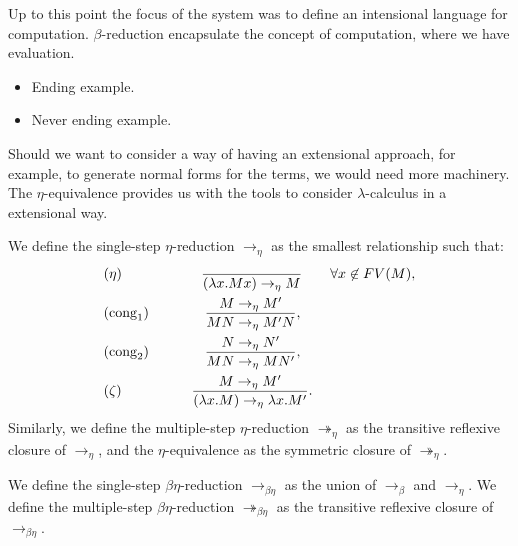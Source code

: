 Up to this point the focus of the system was to define an intensional language for computation. $\beta$-reduction encapsulate the concept of computation, where we have evaluation.

\begin{example}
  \begin{itemize}
  \item Ending example.
  \item Never ending example.
  \end{itemize}
\end{example}


Should we want to consider a way of having an extensional approach, for example, to generate normal forms for the terms, we would need more machinery. The $\eta$-equivalence provides us with the tools to consider $\lambda$-calculus in a extensional way. \\

\begin{definition}
  We define the single-step $\eta$-reduction $\to_\eta$ as the smallest relationship such that: 
  \begin{align*}
    &(\eta) \qquad\qquad \ \ \ \  \ {\ \over(\lambda x.Mx) \to_\eta M} \qquad \forall x \not  \in FV(M),\\
    &(\operatorname{cong}_1)\qquad\qquad{ M \to_\eta M' \over MN \to_\eta M'N },\\
    &(\operatorname{cong}_2)\qquad\qquad{ N \to_\eta N' \over MN \to_\eta MN' },\\
    &(\zeta) \qquad\qquad \ \  \ {M\to_\eta M' \over(\lambda x.M) \to_\eta \lambda x.M'}.\\
  \end{align*}
  Similarly, we define the multiple-step $\eta$-reduction $\twoheadrightarrow_\eta$ as the transitive reflexive closure of $\to_\eta$, and the $\eta$-equivalence as the symmetric closure of $\twoheadrightarrow_\eta$.
\end{definition}
\begin{definition}
  We define the single-step $\beta\eta$-reduction $\to_{\beta\eta}$ as the union of $\to_\beta$ and $\to_\eta$.  We define the multiple-step $\beta\eta$-reduction $\twoheadrightarrow_{\beta\eta}$ as the transitive reflexive closure of $\to_{\beta\eta}$.
\end{definition}



